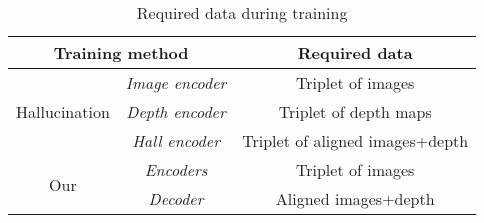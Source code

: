 {
\renewcommand{\arraystretch}{1.5}
\begin{table}
	\caption{\label{tab/data}Required data during training}
	\footnotesize \center
	\begin{tabular}{c | c | c}
	\multicolumn{2}{c|}{\textbf{Training method}} & \textbf{Required data} \\
	\hline
	\multirow{3}{*}{Hallucination} & \textit{Image encoder}	& Triplet of images\\
	\cline{2-3}
								   & \textit{Depth encoder}	& Triplet of depth maps\\
	\cline{2-3}
							       & \textit{Hall encoder}	& Triplet of aligned images+depth\\
	\hline
	\multirow{2}{*}{Our} & \textit{Encoders} & Triplet of images\\
	\cline{2-3}
						 & \textit{Decoder} & Aligned images+depth\\
	\end{tabular}
\end{table}
}